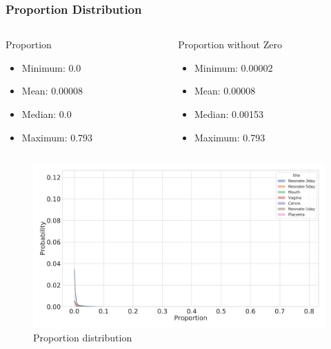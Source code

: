 \documentclass{beamer}
\begin{document}
    \begin{frame}
        \frametitle{Proportion Distribution}

        \begin{columns}
            \begin{column}{0.4 \linewidth}
                \begin{block}{Proportion}
                    \begin{itemize}
                        \item Minimum: 0.0
                        \item Mean: 0.00008
                        \item Median: 0.0
                        \item Maximum: 0.793
                    \end{itemize}
                \end{block}
            \end{column}

            \begin{column}{0.4 \linewidth}
                \begin{block}{Proportion without Zero}
                    \begin{itemize}
                        \item Minimum: 0.00002
                        \item Mean: 0.00008
                        \item Median: 0.00153
                        \item Maximum: 0.793
                    \end{itemize}
                \end{block}
            \end{column}
        \end{columns}

        \begin{figure}
            \includegraphics[width=0.5 \linewidth]{figures/Step53_Proportion/everything.DADA2.homd.uncorrected.pdf}
            \caption{Proportion distribution}
        \end{figure}
    \end{frame}
\end{document}
